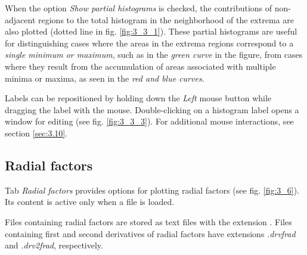 \documentclass[10pt]{article}
\begin{document}
\vspace*{5mm}

When the option {\it Show partial histograms} is checked,  
the contributions of non-adjacent regions to the total histogram  
in the neighborhood of the extrema are also plotted (dotted line in fig. \ref{fig:3_3_1}).  
These partial histograms are useful for distinguishing cases  
where the areas in the extrema regions correspond to a {\it single minimum or maximum},  
such as in the {\it green curve} in the figure,  
from cases where they result from the accumulation of areas associated  
with multiple minima or maxima, as seen in the {\it red and blue curves}.  

Labels can be repositioned by holding down the {\it Left} mouse button  
while dragging the label with the mouse.  
Double-clicking on a histogram label opens a window for editing  
(see fig. \ref{fig:3_3_3}).  
For additional mouse interactions, see section \ref{sec:3.10}.  


\subsection{Radial factors \label{sec:3.4}}

Tab {\it Radial factors} provides options for plotting radial factors  
(see fig. \ref{fig:3_6}). Its content is active only when a \frad{ } file is loaded.  

Files containing radial factors are stored as text files with the extension \frad{ }.  
Files containing first and second derivatives of radial factors  
have extensions {\it .drvfrad} and {\it .drv2frad}, respectively.  
\end{document}
